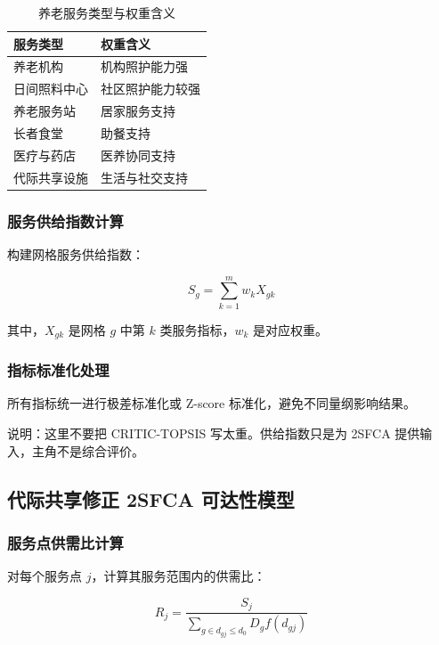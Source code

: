 \begin{table}[H]
\centering
\caption{养老服务类型与权重含义}
\begin{tabular}{ll}
\toprule
\rowcolor{tablehead}
服务类型 & 权重含义 \\
\midrule
养老机构 & 机构照护能力强 \\
日间照料中心 & 社区照护能力较强 \\
养老服务站 & 居家服务支持 \\
长者食堂 & 助餐支持 \\
医疗与药店 & 医养协同支持 \\
代际共享设施 & 生活与社交支持 \\
\bottomrule
\end{tabular}
\end{table}

\subsubsection{服务供给指数计算}

构建网格服务供给指数：

\begin{equation}
S_g = \sum_{k=1}^{m} w_k X_{gk}
\end{equation}

其中，$X_{gk}$ 是网格 $g$ 中第 $k$ 类服务指标，$w_k$ 是对应权重。

\subsubsection{指标标准化处理}

所有指标统一进行极差标准化或 Z-score 标准化，避免不同量纲影响结果。

说明：这里不要把 CRITIC-TOPSIS 写太重。供给指数只是为 2SFCA 提供输入，主角不是综合评价。

\subsection{代际共享修正 2SFCA 可达性模型}

\subsubsection{服务点供需比计算}

对每个服务点 $j$，计算其服务范围内的供需比：

\begin{equation}
R_j = \frac{S_j}{\sum_{g \in d_{gj} \leq d_0} D_g f(d_{gj})}
\end{equation}

